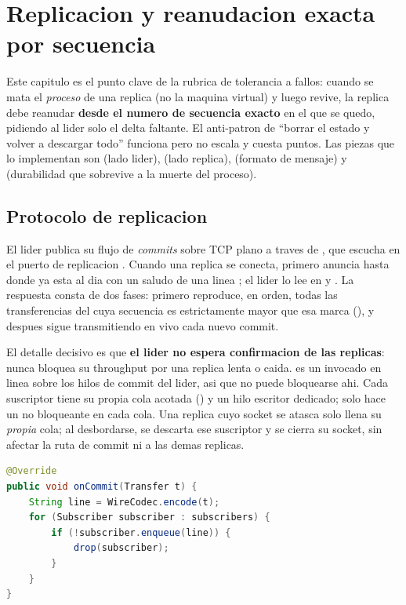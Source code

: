 \section{Replicacion y reanudacion exacta por secuencia}

Este capitulo es el punto clave de la rubrica de tolerancia a fallos: cuando se
mata el \emph{proceso} de una replica (no la maquina virtual) y luego revive, la
replica debe reanudar \textbf{desde el numero de secuencia exacto} en el que se
quedo, pidiendo al lider solo el delta faltante. El anti-patron de ``borrar el
estado y volver a descargar todo'' funciona pero no escala y cuesta puntos. Las
piezas que lo implementan son  (lado lider),
 (lado replica), 
(formato de mensaje) y  (durabilidad que
sobrevive a la muerte del proceso).

\subsection{Protocolo de replicacion}

El lider publica su flujo de \emph{commits} sobre TCP plano a traves de
, que escucha en el puerto de replicacion
. Cuando una replica se conecta, primero anuncia hasta
donde ya esta al dia con un saludo de una linea ; el lider
lo lee en  y . La respuesta consta
de dos fases: primero reproduce, en orden, todas las transferencias del
 cuya secuencia es estrictamente mayor que esa marca
(), y despues sigue transmitiendo en vivo cada nuevo
commit.

El detalle decisivo es que \textbf{el lider no espera confirmacion de las
replicas}: nunca bloquea su throughput por una replica lenta o caida.
 es un  invocado en linea
sobre los hilos de commit del lider, asi que no puede bloquearse ahi. Cada
suscriptor tiene su propia cola acotada () y un
hilo escritor dedicado;  solo hace un  no
bloqueante en cada cola. Una replica cuyo socket se atasca solo llena su
\emph{propia} cola; al desbordarse, se descarta ese suscriptor y se cierra su
socket, sin afectar la ruta de commit ni a las demas replicas.

\begin{lstlisting}[language=Java,caption={ReplicaFeed.onCommit: fan-out no bloqueante hacia las replicas}]
@Override
public void onCommit(Transfer t) {
    String line = WireCodec.encode(t);
    for (Subscriber subscriber : subscribers) {
        if (!subscriber.enqueue(line)) {
            drop(subscriber);
        }
    }
}
\end{lstlisting}

